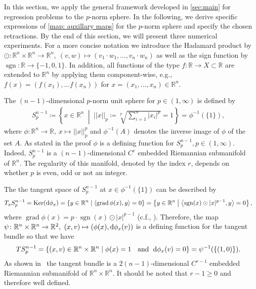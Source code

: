 \documentclass[11pt,a4paper]{article}
\theoremstyle{plain}
\theoremstyle{definition}
\newcommand{\RR}{\mathbb{R}}
\newcommand{\set}[2]{\left\{#1 \;\middle|\; #2\right\}}		%
\newcommand{\norm}[1]{\left|\left| #1 \right|\right|}
\DeclareMathOperator{\grad}{grad}
\DeclareMathOperator{\Ker}{Ker}
\DeclareMathOperator{\sgn}{sgn}
\begin{document}
In this section, we apply the general framework developed in \cref{sec:main} for regression problems to the $p$-norm sphere. In the following, we derive specific expressions of \eqref{map: auxillary maps} for the $p$-norm sphere and specify the chosen retractions. By the end of this section, we will present three numerical experiments. For a more concise notation we introduce the Hadamard product by $\odot\colon\RR^n\times\RR^n\to \RR^n,\ (v, w)\mapsto (v_1\cdot w_1, \ldots, v_n\cdot w_n)$ as well as the sign function by $\sgn\colon\RR\to\{-1, 0, 1\}$. In addition, all functions of the type $f\colon\RR\to X\subset \RR$ are extended to $\RR^n$ by applying them component-wise, e.g., $f(x) = (f(x_1), \ldots f(x_n))$ for $x = (x_1,\dots,x_n)\in\RR^n$.

The $(n-1)$-dimensional $p$-norm unit sphere for $p\in(1, \infty)$ is defined by
\begin{align*}
	S_p^{n-1}
	\coloneqq\set{x\in\RR^n}{\norm{x}_p\coloneqq \sqrt[p]{\sum\limits_{i = 1}^n |x_i|^p} = 1}
	= \phi^{-1}\left(\{1\}\right),
\end{align*}
where $\phi\colon\RR^n\to \RR,\ x\mapsto \norm{x}_p^p$ and $\phi^{-1}(A)$ denotes the inverse image of $\phi$ of the set $A$. As stated in the proof \cite[Thm.~1]{sato2023} $\phi$ is a defining function for $S_p^{n-1}, p\in(1, \infty)$. Indeed, $S_p^{n-1}$ is a $(n - 1)$-dimensional $C^r$ embedded Riemannian submanifold of $\RR^n$. The regularity of this manifold, denoted by the index $r$, depends on whether $p$ is even, odd or not an integer. 

The the tangent space of $S_p^{n-1}$ at $x\in\phi^{-1}(\{1\})$ can be described by
\begin{align*}
	T_xS_p^{n-1}
	= \Ker(\textup{d}\phi_x) 
	= \set{y\in\RR^n}{\left<\grad\phi(x), y\right>  = 0} 
	= \set{y\in\RR^n}{\left<\sgn(x)\odot|x|^{p-1}, y\right>  = 0},
\end{align*}
where $\grad \phi(x) = p\cdot \sgn(x)\odot |x|^{p-1}$ (c.f., \cite[p.~900]{sato2023}). Therefore, the map $\psi\colon\RR^n\times\RR^n\to\RR^2,\ (x, v)\mapsto (\phi(x), \textup{d}\phi_x(v))$ is a defining function for the tangent bundle so that we have
\begin{align*}
	TS_p^{n-1}
	= \set{(x, v)\in \RR^n\times \RR^n}{\phi(x) = 1 \;\ \text{ and }\; \textup{d}\phi_x(v) = 0}
	= \psi^{-1}(\{(1, 0)\}).
\end{align*}
As shown in~\cite[Thm.~3.43, p.~37]{boumal2023} the tangent bundle is a $2(n - 1)$-dimensional $C^{r-1}$ embedded Riemannian submanifold of $\RR^n\times\RR^n$. It should be noted that $r - 1\geq 0$ and therefore well defined. 
\end{document}
